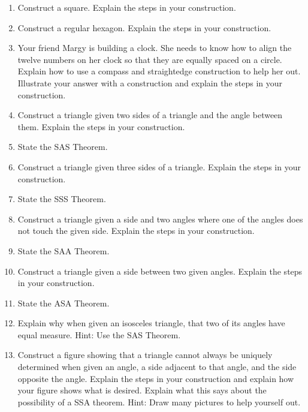 \begin{problems}
\begin{enumerate}


\item Construct a square. Explain the steps in your construction.

\item Construct a regular hexagon. Explain the steps in your construction.


\item Your friend Margy is building a clock. She needs to know how to align
the twelve numbers on her clock so that they are equally spaced on a
circle. Explain how to use a compass and straightedge construction to
help her out. Illustrate your answer with a construction and explain
the steps in your construction.

\item Construct a triangle given two sides of a triangle and the angle
  between them. Explain the steps in your construction.

\item State the SAS Theorem.

\item Construct a triangle given three sides of a triangle. Explain
  the steps in your construction.

\item State the SSS Theorem.


\item Construct a triangle given a side and two angles where one of
  the angles does not touch the given side. Explain the steps in your
  construction.

\item State the SAA Theorem.

\item Construct a triangle given a side between two given
  angles. Explain the steps in your construction.

\item State the ASA Theorem.

\item Explain why when given an isosceles triangle, that two
  of its angles have equal measure. Hint: Use the SAS Theorem.


\item Construct a figure showing that a triangle cannot always be
  uniquely determined when given an angle, a side adjacent to that
  angle, and the side opposite the angle. Explain the steps in your
  construction and explain how your figure shows what is
  desired. Explain what this says about the possibility of a SSA
  theorem.  Hint: Draw many pictures to help yourself out.


\end{enumerate}
\end{problems}
